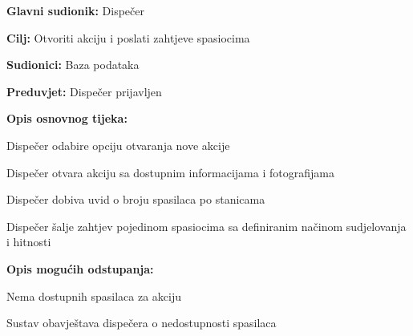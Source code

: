 					\noindent {}
					\begin{packed_item}
	
						\item \textbf{Glavni sudionik: }\text Dispečer
						\item  \textbf{Cilj:} \text Otvoriti akciju i poslati zahtjeve spasiocima
						\item  \textbf{Sudionici:} \text Baza podataka
						\item  \textbf{Preduvjet:} \text Dispečer prijavljen
						\item  \textbf{Opis osnovnog tijeka:}
						
						\item[] \begin{packed_enum}
							
							\item \text Dispečer odabire opciju otvaranja nove akcije
							\item \text Dispečer otvara akciju sa dostupnim informacijama i fotografijama
							\item \text Dispečer dobiva uvid o broju spasilaca po stanicama
							\item \text Dispečer šalje zahtjev pojedinom spasiocima sa definiranim načinom sudjelovanja i hitnosti
						\end{packed_enum}
						
						\item  \textbf{Opis mogućih odstupanja:}
						
						\item[] \begin{packed_item}
	
							\item[2.a] \text Nema dostupnih spasilaca za akciju
							\item[] \begin{packed_item}
								
								\item \text Sustav obavještava dispečera o nedostupnosti spasilaca
								
							\end{packed_item}
							
						\end{packed_item}
					\end{packed_item}

